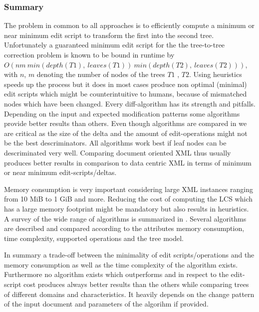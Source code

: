 \subsubsection{Summary}
The problem in common to all approaches is to efficiently compute a minimum or near minimum edit script to transform the first into the second tree. Unfortunately a guaranteed minimum edit script for the the tree-to-tree correction problem is known to be bound in runtime by \\$O(nm\ min(depth(T1),\ leaves(T1))\ min(depth(T2),\ leaves(T2)))$, with $n$, $m$ denoting the number of nodes of the trees $T1$ , $T2$. Using heuristics speeds up the process but it does in most cases produce non optimal (minimal) edit scripts which might be counterintuitive to humans, because of mismatched nodes which have been changed. Every diff-algorithm has its strength and pitfalls. Depending on the input and expected modification patterns some algorithms provide better results than others. Even though algorithms are compared in \cite{ronnau2009efficient} we are critical as the size of the delta and the amount of edit-operations might not be the best descriminators. All algorithms work best if leaf nodes can be descriminated very well. Comparing document oriented XML thus usually produces better results in comparison to data centric XML in terms of minimum or near minimum edit-scripts/deltas.

Memory consumption is very important considering large XML instances ranging from 10 MiB to 1 GiB and more. Reducing the cost of computing the LCS which has a large memory footprint might be mandatory but also results in heuristics. A survey of the wide range of algorithms is summarized in \cite{cobena2002comparative}. Several algorithms are described and compared according to the attributes memory consumption, time complexity, supported operations and the tree model.

In summary a trade-off between the minimality of edit scripts/operations and the memory consumption as well as the time complexity of the algorithm exists. Furthermore no algorithm exists which outperforms and in respect to the edit-script cost produces always better results than the others while comparing trees of different domains and characteristics. It heavily depends on the change pattern of the input document and parameters of the algorihm if provided.

